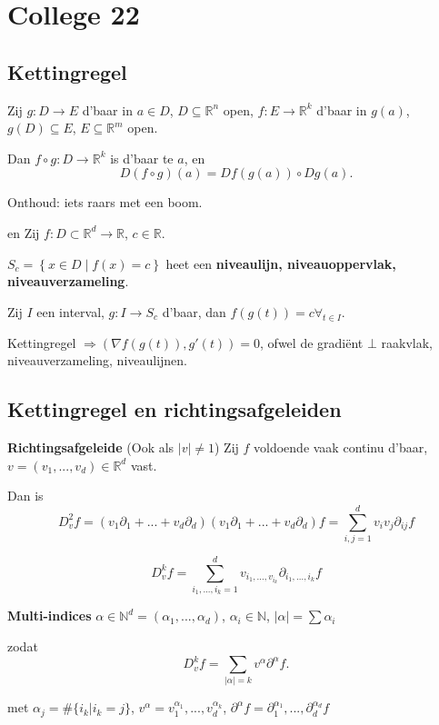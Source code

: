 \documentclass[a4paper]{exam}
\theoremstyle{definition}
\newcommand{\naturals}{\mathbb{N}}
\newcommand{\reals}{\mathbb{R}}
\begin{document}
	\newpage
	\section{College 22}
	\subsection{Kettingregel}
	\theorem Zij $g:D \to E$ d'baar in $a \in D$, $D \subseteq \reals^n$ open, $f:E \to \reals^k$ d'baar in $g(a)$, $g(D) \subseteq E$, $E \subseteq \reals^m$ open.
	
	Dan $f\circ g:D\to \reals^k$ is d'baar te $a$, en \[ D(f \circ g)(a) = Df(g(a))\circ Dg(a). \]
	
	Onthoud: iets raars met een boom.
	
	\gevolg en  Zij $f:D \subset \reals^d \to \reals$, $c \in \reals$. 
	
	$S_c = \left\{ x\in D \middle| f(x)=c \right\}$ heet een \textbf{niveaulijn, niveauoppervlak, niveauverzameling}.
	
	Zij $I$ een interval, $g: I\to S_c$ d'baar, dan $f(g(t))=c \forall_{t \in I}$.
	
	\opm Kettingregel $\Rightarrow (\nabla f(g(t)),g'(t)) = 0$, ofwel de gradi\"ent $\bot$ raakvlak, niveauverzameling, niveaulijnen.
	
	\subsection{Kettingregel en richtingsafgeleiden}
	
	 \textbf{Richtingsafgeleide} (Ook als $|v|\neq 1$)
	Zij $f$ voldoende vaak continu d'baar, $v=(v_1,...,v_d) \in \reals^d$ vast.
	
	Dan is \[ D_v^2 f = (v_1 \partial_1 + ... + v_d \partial_d)(v_1 \partial_1 + ... + v_d \partial_d)f = \sum_{i,j=1}^{d} v_i v_j \partial_{ij}f \]
	
	\[ D_v^k f = \sum_{i_1,...,i_k=1}^{d} v_{{i_1},...,v_{i_k}} \partial_{i_1,...,i_k} f \]
	
	\nota \textbf{Multi-indices} $ \alpha \in \naturals^d = (\alpha_1 ,..., \alpha_d) $, $\alpha_i \in \naturals$, $ |\alpha| = \sum \alpha_i $
	
	zodat \[ D_v^k f = \sum_{|\alpha|=k} v^\alpha \partial^\alpha f. \]
	
	met $ \alpha_j = \#\{i_k | i_k = j\} $, $ v^\alpha = v_1^{\alpha_1} ,..., v_d^{\alpha_k} $, $ \partial^\alpha f = \partial_1^{\alpha_1},...,\partial_d^{\alpha_d} f $
	
\end{document}
